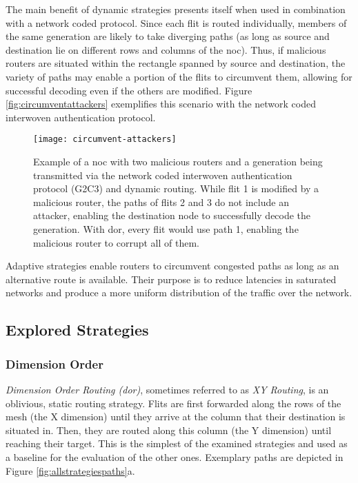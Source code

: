 The main benefit of dynamic strategies presents itself when used in combination with a network coded protocol. Since each flit is routed individually,
members of the same generation are likely to take diverging paths (as long as source and destination lie on different rows and columns of the
\gls{noc}). Thus, if malicious routers are situated within the rectangle spanned by source and destination, the variety of paths may enable a portion
of the flits to circumvent them, allowing for successful decoding even if the others are modified. Figure \vref{fig:circumventattackers} exemplifies
this scenario with the network coded interwoven authentication protocol.

\begin{figure}
    \centering
    \texttt{[image: circumvent-attackers]}
    \caption[Example of dynamic routing dodging malicious routers]{Example of a \gls{noc} with two malicious routers and a generation being
    transmitted via the network coded interwoven authentication protocol (G2C3) and dynamic routing. While flit 1 is modified by a malicious router,
    the paths of flits 2 and 3 do not include an attacker, enabling the destination node to successfully decode the generation. With \gls{dor}, every
    flit would use path 1, enabling the malicious router to corrupt all of them.}
    \label{fig:circumventattackers}
\end{figure}

Adaptive strategies enable routers to circumvent congested paths as long as an alternative route is available. Their purpose is to reduce latencies in
saturated networks and produce a more uniform distribution of the traffic over the network.

\subsection{Explored Strategies}\label{subsec:routingstrategies}
\subsubsection{Dimension Order}\label{subsubsec:dor}
\textit{Dimension Order Routing (\gls{dor})}, sometimes referred to as \textit{XY Routing}, is an oblivious, static routing strategy. Flits are first
forwarded along the rows of the mesh (the X dimension) until they arrive at the column that their destination is situated in. Then, they are routed
along this column (the Y dimension) until reaching their target. This is the simplest of the examined strategies and used as a baseline for the
evaluation of the other ones. Exemplary paths are depicted in Figure \ref{fig:allstrategiespaths}a.

